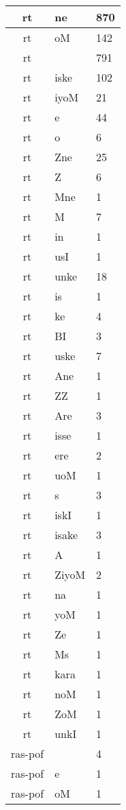 \documentclass[a4 paper]{article}
\begin{document}
\begin{longtable}{cp{}p{}}
rt & ne & 870\\ \midrule rt & oM & 142\\ \midrule rt &  & 791\\ \midrule rt & iske & 102\\ \midrule rt & iyoM & 21\\ \midrule rt & e & 44\\ \midrule rt & o & 6\\ \midrule rt & Zne & 25\\ \midrule rt & Z & 6\\ \midrule rt & Mne & 1\\ \midrule rt & M & 7\\ \midrule rt & in & 1\\ \midrule rt & usI & 1\\ \midrule rt & unke & 18\\ \midrule rt & is & 1\\ \midrule rt & ke & 4\\ \midrule rt & BI & 3\\ \midrule rt & uske & 7\\ \midrule rt & Ane & 1\\ \midrule rt & ZZ & 1\\ \midrule rt & Are & 3\\ \midrule rt & isse & 1\\ \midrule rt & ere & 2\\ \midrule rt & uoM & 1\\ \midrule rt & s & 3\\ \midrule rt & iskI & 1\\ \midrule rt & isake & 3\\ \midrule rt & A & 1\\ \midrule rt & ZiyoM & 2\\ \midrule rt & na & 1\\ \midrule rt & yoM & 1\\ \midrule rt & Ze & 1\\ \midrule rt & Ms & 1\\ \midrule rt & kara & 1\\ \midrule rt & noM & 1\\ \midrule rt & ZoM & 1\\ \midrule rt & unkI & 1\\ \midrule 
ras-pof &  & 4\\ \midrule ras-pof & e & 1\\ \midrule ras-pof & oM & 1\\ \midrule 

\end{longtable}
\end{document}
